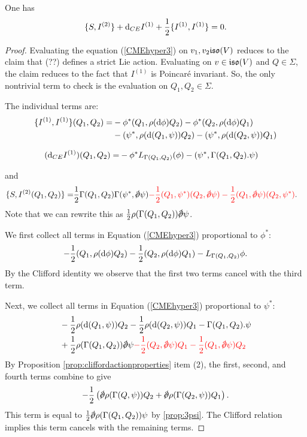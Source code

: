 \documentclass[10pt, oneside]{article}
\begin{document}
\begin{lemma} 
One has
\begin{equation}\label{CMEhyper3}
\{S, I^{(2)}\} + {\rm d}_{CE} I^{(1)} + \frac{1}{2} \{I^{(1)}, I^{(1)}\} = 0 .
\end{equation}
\end{lemma}
\begin{proof}
Evaluating the equation (\ref{CMEhyper3}) on $v_1,v_2 \mathfrak{iso}(V)$ reduces to the claim that (??) defines a strict Lie action. 
Evaluating on $v \in \mathfrak{iso}(V)$ and $Q \in \Sigma$, the claim reduces to the fact that $I^{(1)}$ is Poincar\'{e} invariant.
So, the only nontrivial term to check is the evaluation on $Q_1,Q_2 \in \Sigma$. 

The individual terms are:
\begin{align*}
\{I^{(1)}, I^{(1)}\}(Q_1, Q_2) = & - \phi^* (Q_1, \rho({\rm d} \phi) Q_2) - \phi^* (Q_2, \rho({\rm d} \phi)Q_1) \\ &  -  (\psi^*, \rho({\rm d}(Q_1,\psi))Q_2) - (\psi^*, \rho({\rm d}(Q_2, \psi)) Q_1) 
\end{align*}

\begin{align*}
({\rm d}_{CE}I^{(1)})(Q_1,Q_2) = & - \phi^* L_{\Gamma(Q_1,Q_2)} (\phi) - (\psi^*, \Gamma(Q_1,Q_2) . \psi)
\end{align*}

and
\begin{align*}
\{S, I^{(2)}(Q_1,Q_2)\} = & \frac{1}{2} \Gamma(Q_1,Q_2) \Gamma(\psi^*, \sd \dd \psi) \textcolor{red}{- \frac{1}{2} (Q_1, \psi^*) (Q_2, \sd \dd \psi) - \frac{1}{2} (Q_1, \sd \dd \psi) (Q_2, \psi^*) }.
\end{align*}
Note that we can rewrite this as $\frac{1}{2} \rho(\Gamma(Q_1, Q_2)) \sd \dd \psi$. 

We first collect all terms in Equation (\ref{CMEhyper3}) proportional to $\phi^*$:
\[
- \frac{1}{2} (Q_1, \rho({\rm d}\phi) Q_2) - \frac{1}{2} (Q_2, \rho({\rm d} \phi) Q_1) - L_{\Gamma(Q_1,Q_2)} \phi .
\]
By the Clifford identity
 we observe that the first two terms cancel with the third term.  

Next, we collect all terms in Equation (\ref{CMEhyper3}) proportional to $\psi^*$:
\begin{align*}
& - \frac{1}{2} \rho(\d(Q_1,\psi))Q_2 - \frac{1}{2} \rho(\d(Q_2, \psi)) Q_1 - \Gamma(Q_1,Q_2) . \psi
\\ 
& + \frac{1}{2} \rho(\Gamma(Q_1,Q_2)) \sd \dd \psi \textcolor{red}{ - \frac{1}{2} (Q_2, \sd \dd \psi)Q_1 - \frac{1}{2} (Q_1, \sd \dd \psi)Q_2}
\end{align*}
By Proposition \ref{prop:cliffordactionproperties} item (2), the first, second, and fourth terms combine to give
\[
- \frac{1}{2} \left( \sd \dd \rho(\Gamma(Q,\psi)) Q_2 + \sd \dd \rho(\Gamma(Q_2, \psi))Q_1 \right)  .
\]
This term is equal to $\frac{1}{2} \sd \dd \rho(\Gamma(Q_1,Q_2)) \psi$ by \ref{prop:3psi}. 
The Clifford relation implies this term cancels with the remaining terms. 

\end{proof}
\end{document}
